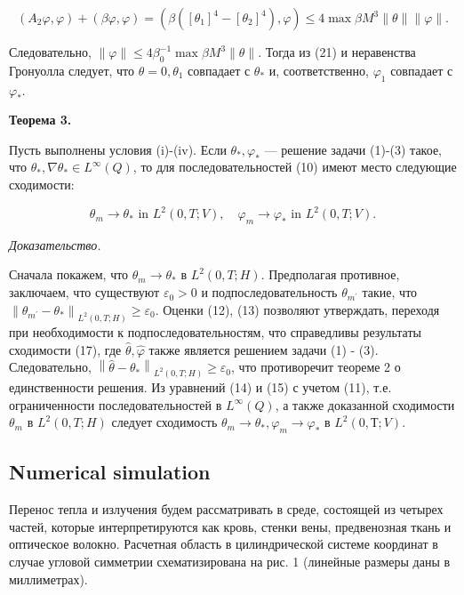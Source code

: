 \[
    \left(A_{2} \varphi, \varphi\right)+(\beta \varphi, \varphi)=
    \left(\beta\left(\left[\theta_{1}\right]^{4}-\left[\theta_{2}\right]^{4}\right), \varphi\right)
    \leq 4 \max \beta M^{3}\|\theta\|\|\varphi\|.
\]


Следовательно, $\|\varphi\| \leq 4 \beta_{0}^{-1} \max \beta M^{3}\|\theta\|$.
Тогда из (21) и неравенства Гронуолла следует, что $\theta=0, \theta_{1}$
совпадает с $\theta_{*}$ и, соответственно, $\varphi_{1}$ совпадает с $\varphi_{*}$.

\textbf{Теорема 3.}

Пусть выполнены условия (i)-(iv).
Если $\theta_{*}, \varphi_{*}$ — решение задачи (1)-(3) такое,
что $\theta_{*}, \nabla \theta_{*} \in L^{\infty }(Q)$,
то для последовательностей (10) имеют место следующие сходимости:

\[
    \theta_{m} \rightarrow \theta_{*} \text { in } L^{2}(0, T ; V),
    \quad \varphi_{m} \rightarrow \varphi_{*} \text { in } L^{2}(0, T ; V).
\]


\textit{Доказательство.}

Сначала покажем, что $\theta_{m} \rightarrow \theta_{*}$ в $L^{2}(0, T ; H)$.
Предполагая противное, заключаем, что существуют $\varepsilon_{0}>0$ и подпоследовательность
$\theta_{m^{\prime}}$ такие, что
$\left\|\theta_{m^{\prime}} -\theta_{*}\right\|_{L^{2}(0, T ; H)} \geq \varepsilon_{0}$.
Оценки (12), (13) позволяют утверждать, переходя при необходимости к подпоследовательностям,
что справедливы результаты сходимости (17), где $\widehat{\theta}, \widehat{\varphi}$
также является решением задачи (1) - (3).
Следовательно, $\left\|\widehat{\theta}-\theta_{*}\right\|_{L^{2}(0, T ; H)} \geq \varepsilon_{0}$,
что противоречит теореме 2 о единственности решения.
Из уравнений (14) и (15) с учетом (11), т.е. ограниченности последовательностей в $L^{\infty}(Q)$,
а также доказанной сходимости $\theta_{m}$ в $L^{2}(0, T ; H)$
следует сходимость $\theta_{m} \rightarrow \theta_{*}, \varphi_{m} \rightarrow \varphi_{*}$ в $L^ {2}(0, Т; V).$

\subsection{Numerical simulation}\label{subsec:ch3:sec1:subsec5}

Перенос тепла и излучения будем рассматривать в среде, состоящей из четырех частей,
которые интерпретируются как кровь, стенки вены, предвенозная ткань и оптическое волокно.
Расчетная область в цилиндрической системе координат в случае угловой симметрии схематизирована
на рис. 1 (линейные размеры даны в миллиметрах).


